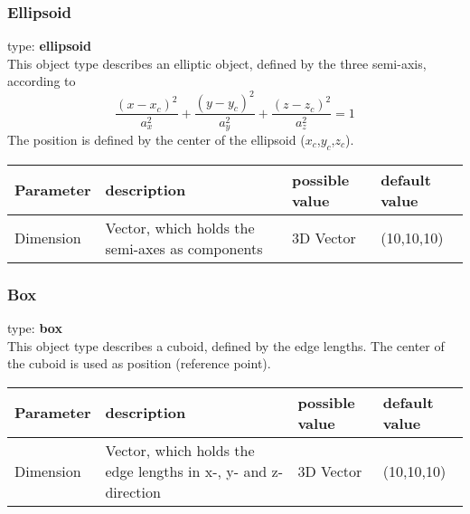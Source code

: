 \documentclass[a4paper,html,11pt,openany]{book}
\begin{document}
 \subsubsection{Ellipsoid}
 type: \textbf {ellipsoid} \\
 This object type describes an elliptic object, defined by the three semi-axis, according to
  \begin{equation}
  \frac{(x-x_c)^2}{a_x^2}+\frac{(y-y_c)^2}{a_y^2}+\frac{(z-z_c)^2}{a_z^2}=1
\end{equation}   
The position is defined by the center of the ellipsoid ($x_c$,$y_c$,$z_c$).

\vspace{1em}
\begin{tabular}{p{2cm}|p{4cm}|p{4cm}|p{1cm}}
 Parameter  & description  & possible value & default value\\
 \hline
 Dimension & Vector, which holds the semi-axes as components & 3D Vector & (10,10,10) 
 \end{tabular}
 \subsubsection{Box}
 type: \textbf{box} \\
 This object type describes a cuboid, defined by the edge lengths. The center of the cuboid is used as position (reference point).
 
\vspace{1em}
\begin{tabular}{p{2cm}|p{4cm}|p{4cm}|p{1cm}}
 Parameter  & description  & possible value & default value\\
 \hline
 Dimension & Vector, which holds the edge lengths in x-, y- and z-direction & 3D Vector & (10,10,10) 
 \end{tabular}
\end{document}

